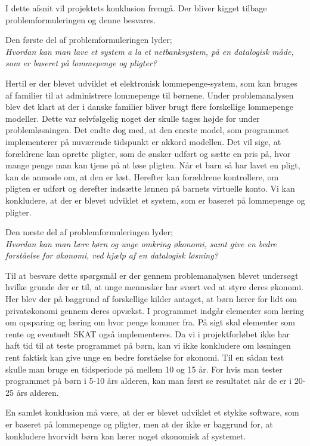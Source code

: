 I dette afsnit vil projektets konklusion fremgå. Der bliver kigget tilbage problemformuleringen og denne besvares.  

Den første del af problemformuleringen lyder;\\
\textit{Hvordan kan man lave et system a la et netbanksystem, på en datalogisk måde, som er baseret på lommepenge og pligter?}

Hertil er der blevet udviklet et elektronisk lommepenge-system, som kan bruges af familier til at administrere lommepenge til børnene. Under problemanalysen blev det klart at der i danske familier bliver brugt flere forskellige lommepenge modeller. Dette var selvfølgelig noget der skulle tages højde for under problemløsningen. Det endte dog med, at den eneste model, som programmet implementerer på nuværende tidspunkt er akkord modellen. Det vil sige, at forældrene kan oprette pligter, som de ønsker udført og sætte en pris på, hvor mange penge man kan tjene på at løse pligten. Når et barn så har lavet en pligt, kan de anmode om, at den er løst. Herefter kan forældrene kontrollere, om pligten er udført og derefter indsætte lønnen på barnets virtuelle konto. Vi kan konkludere, at der er blevet udviklet et system, som er baseret på lommepenge og pligter.

Den næste del af problemformuleringen lyder;\\
\textit{Hvordan kan man lære børn og unge omkring økonomi, samt give en bedre forståelse for økonomi, ved hjælp af en datalogisk løsning?}

Til at besvare dette spørgsmål er der gennem problemanalysen blevet undersøgt hvilke grunde der er til, at unge mennesker har svært ved at styre deres økonomi. Her blev der på baggrund af forskellige kilder antaget, at børn lærer for lidt om privatøkonomi gennem deres opvækst. 
I programmet indgår elementer som læring om opsparing og læring om hvor penge kommer fra. På sigt skal elementer som rente og eventuelt SKAT også implementeres. Da vi i projektforløbet ikke har haft tid til at teste programmet på børn, kan vi ikke konkludere om løsningen rent faktisk kan give unge en bedre forståelse for økonomi. Til en sådan test skulle man bruge en tidsperiode på mellem 10 og 15 år. For hvis man tester programmet på børn i 5-10 års alderen, kan man først se resultatet når de er i 20-25 års alderen.

En samlet konklusion må være, at der er blevet udviklet et stykke software, som er baseret på lommepenge og pligter, men at der ikke er baggrund for, at konkludere hvorvidt børn kan lærer noget økonomisk af systemet.
